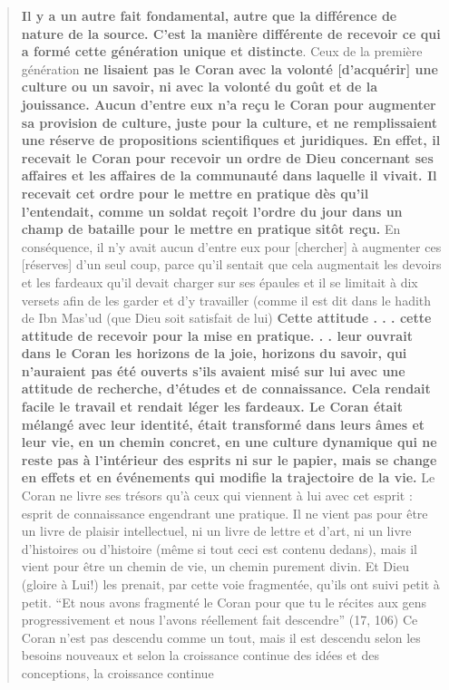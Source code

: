 \begin{quote}
    \textbf{Il y a un autre fait fondamental, autre que la différence de
nature de la source. C'est la manière différente de recevoir ce qui a
formé cette génération unique et distincte}. Ceux de la première
génération \textbf{ne lisaient pas le Coran avec la volonté
{[}d'acquérir{]} une culture ou un savoir, ni avec la volonté du goût et
de la jouissance. Aucun d'entre eux n'a reçu le Coran pour augmenter sa
provision de culture, juste pour la culture, et ne remplissaient une
réserve de propositions scientifiques et juridiques. En effet, il
recevait le Coran pour recevoir un ordre de Dieu concernant ses affaires
et les affaires de la communauté dans laquelle il vivait. Il recevait
cet ordre pour le mettre en pratique dès qu'il l'entendait, comme un
soldat reçoit l'ordre du jour dans un champ de bataille pour le mettre
en pratique sitôt reçu.} En conséquence, il n'y avait aucun d'entre eux
pour {[}chercher{]} à augmenter ces {[}réserves{]} d'un seul coup, parce
qu'il sentait que cela augmentait les devoirs et les fardeaux qu'il
devait charger sur ses épaules et il se limitait à dix versets afin de
les garder et d'y travailler (comme il est dit dans le hadith de Ibn
Mas'ud (que Dieu soit satisfait de lui) \textbf{Cette attitude . . .
cette attitude de recevoir pour la mise en pratique. . . leur ouvrait
dans le Coran les horizons de la joie, horizons du savoir, qui
n'auraient pas été ouverts s'ils avaient misé sur lui avec une attitude
de recherche, d'études et de connaissance. Cela rendait facile le
travail et rendait léger les fardeaux. Le Coran était mélangé avec leur
identité, était transformé dans leurs âmes et leur vie, en un chemin
concret, en une culture dynamique qui ne reste pas à l'intérieur des
esprits ni sur le papier, mais se change en effets et en événements qui
modifie la trajectoire de la vie.} Le Coran ne livre ses trésors qu'à
ceux qui viennent à lui avec cet esprit : esprit de connaissance
engendrant une pratique. Il ne vient pas pour être un livre de plaisir
intellectuel, ni un livre de lettre et d'art, ni un livre d'histoires ou
d'histoire (même si tout ceci est contenu dedans), mais il vient pour
être un chemin de vie, un chemin purement divin. Et Dieu (gloire à Lui!)
les prenait, par cette voie fragmentée, qu'ils ont suivi petit à petit.
``Et nous avons fragmenté le Coran pour que tu le récites aux gens
progressivement et nous l'avons réellement fait descendre'' (17, 106) Ce
Coran n'est pas descendu comme un tout, mais il est descendu selon les
besoins nouveaux et selon la
croissance continue des idées et des conceptions, la croissance continue

\end{quote}
